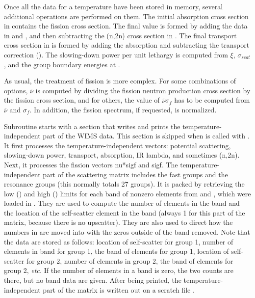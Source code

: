 Once all the data for a temperature have been stored in memory,
several additional operations are performed on them.  The initial
absorption cross section in  contains the fission
cross section.  The final value is formed by adding the data in
 and , and then subtracting the (n,2n)
cross section in .  The final transport cross section in
 is formed by adding the absorption and subtracting the
transport correction ().  The slowing-down power per unit
lethargy is computed from $\xi$, $\sigma_{scat}$, and the group
boundary energies at .

As usual, the treatment of fission is more complex.  For some
combinations of options, $\overline{\nu}$ is computed by dividing
the fission neutron production cross section by the fission cross
section, and for others, the value of $\overline{\nu}\sigma_f$ has
to be computed from $\overline{\nu}$ and $\sigma_f$.  In addition,
the fission spectrum, if requested, is normalized.

Subroutine  starts with a section that writes and
prints the temperature-independent part of the WIMS data.  This
section is skipped when  is called with .
It first processes the temperature-independent vectors: potential
scattering, slowing-down power, transport, absorption, IR
lambda, and sometimes (n,2n).  Next, it processes the fission
vectors nu*sigf and sigf.  The temperature-independent part of
the scattering matrix includes the fast groups and the
resonance groups (this normally totals 27 groups).  It is
packed by retrieving the low () and high ()
limits for each band of nonzero elements from  and
, which were loaded in .  They are used to
compute the number of elements in the band and the location of the
self-scatter element in the band (always 1 for this part of the matrix,
because there is no upscatter).  They are also used to direct
how the numbers in  are moved into  with
the zeros outside of the band removed.  Note that the data are
stored as follows: location of self-scatter for group 1, number
of elements in band for group 1, the band of elements for group 1,
location of self-scatter for group 2, number of elements in group 2,
the band of elements for group 2, {\it etc.}  If the number of elements
in a band is zero, the two counts are there, but no band data are
given.  After being printed, the temperature-independent part of
the matrix is written out on a scratch file .

